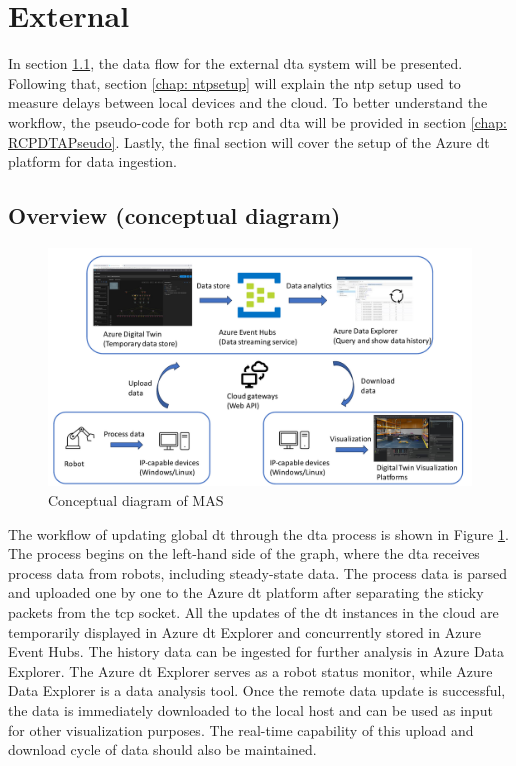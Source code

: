 \section{External} \label{chap: Meth-External}
In section \ref{chap: Overview-External}, the data flow for the external 
\gls{dta} system will be presented. Following that, section \ref{chap: ntpsetup} 
will explain the \gls{ntp} setup used to measure delays between local devices and 
the cloud. To better understand the workflow, the pseudo-code for both \gls{rcp} 
and \gls{dta} will be provided in section \ref{chap: RCPDTAPseudo}. Lastly, the 
final section will cover the setup of the Azure \gls{dt} platform for data ingestion.



\subsection{Overview (conceptual diagram)}\label{chap: Overview-External}

\begin{figure}[htb]
\includegraphics[width=\textwidth]{figures/DT_Conceptual_Diagram.pdf}

\centering
\caption{Conceptual diagram of MAS\label{fig: DTConceptual}}
\end{figure}

The workflow of updating global \gls{dt} through the \gls{dta} process is shown 
in Figure \ref{fig: DTConceptual}. The process begins on the left-hand side of the 
graph, where the \gls{dta} receives process data from robots, including steady-state 
data. The process data is parsed and uploaded one by one to the Azure \gls{dt} 
platform after separating the sticky packets from the \gls{tcp} socket.
All the updates of the \gls{dt} instances in the cloud are temporarily displayed 
in Azure \gls{dt} Explorer and concurrently stored in Azure Event Hubs. The history 
data can be ingested for further analysis in Azure Data Explorer. The Azure \gls{dt} 
Explorer serves as a robot status monitor, while Azure Data Explorer is a data analysis tool.
Once the remote data update is successful, the data is immediately downloaded to the local 
host and can be used as input for other visualization purposes. The real-time capability 
of this upload and download cycle of data should also be maintained.

